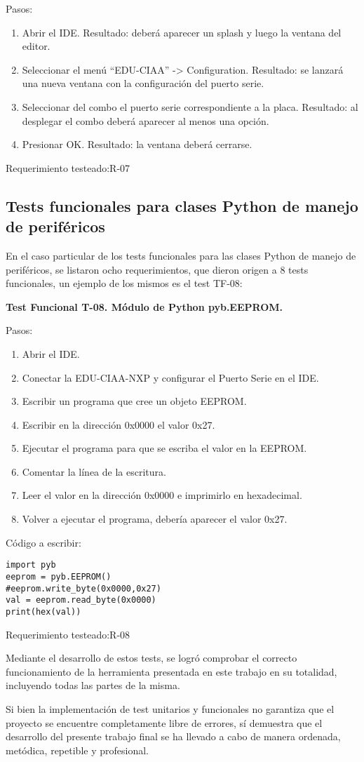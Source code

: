 Pasos:
\begin{enumerate}
	\item Abrir el IDE. Resultado: deberá aparecer un splash y luego la ventana del editor.
	\item Seleccionar el menú “EDU-CIAA” -> Configuration. Resultado: se lanzará una nueva ventana con la configuración del puerto serie.
	\item Seleccionar del combo el puerto serie correspondiente a la placa. Resultado: al desplegar el combo deberá aparecer al menos una opción.
	\item Presionar OK. Resultado: la ventana deberá cerrarse.
\end{enumerate}
	
Requerimiento testeado:R-07


\subsection{Tests funcionales para clases Python de manejo de periféricos}

En el caso particular de los tests funcionales para las clases Python de manejo de periféricos, se listaron ocho requerimientos, que dieron origen a 8 tests funcionales, un ejemplo de los mismos es el test TF-08:

\textbf{Test Funcional T-08. Módulo de Python pyb.EEPROM.}

Pasos:
\begin{enumerate}
	\item Abrir el IDE.
	\item Conectar la EDU-CIAA-NXP y configurar el Puerto Serie en el IDE.
	\item Escribir un programa que cree un objeto EEPROM.
	\item Escribir en la dirección 0x0000 el valor 0x27.
	\item Ejecutar el programa para que se escriba el valor en la EEPROM.
	\item Comentar la línea de la escritura.
	\item Leer el valor en la dirección 0x0000 e imprimirlo en hexadecimal.
	\item Volver a ejecutar el programa, debería aparecer el valor 0x27.
\end{enumerate}

Código a escribir:

\begin{verbatim}
import pyb
eeprom = pyb.EEPROM()
#eeprom.write_byte(0x0000,0x27)
val = eeprom.read_byte(0x0000)
print(hex(val))
\end{verbatim}

Requerimiento testeado:R-08


Mediante el desarrollo de estos tests, se logró comprobar el correcto funcionamiento de la herramienta presentada en este trabajo en su totalidad, incluyendo todas las partes de la misma. 

Si bien la implementación de test unitarios y funcionales no garantiza que el proyecto se encuentre completamente libre de errores, sí demuestra que el desarrollo del presente trabajo final se ha llevado a cabo de manera ordenada, metódica, repetible y profesional.
